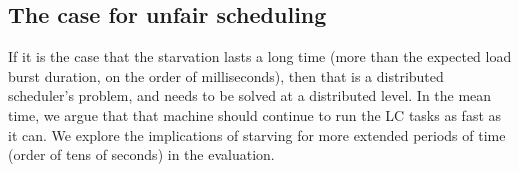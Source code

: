 \subsection{The case for unfair scheduling}


If it is the case that the starvation lasts a long time (more than the expected
load burst duration, on the order of milliseconds), then that is a distributed
scheduler's problem, and needs to be solved at a distributed level. In the mean
time, we argue that that machine should continue to run the LC tasks as fast as
it can. We explore the implications of starving for more extended periods of
time (order of tens of seconds) in the evaluation.


